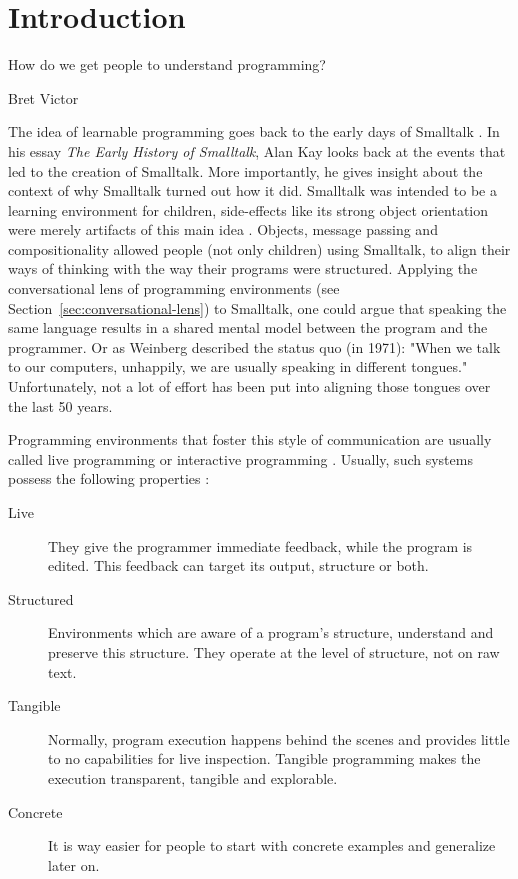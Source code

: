 \chapter[Introduction]{Introduction }
\epigraph{How do we get people to understand programming?}{Bret Victor}

The idea of learnable programming \cite{victor_learnable_2012} goes back to the early days of Smalltalk \cite{kay_early_1993}.
In his essay \emph{The Early History of Smalltalk}, Alan Kay looks back at the events that led to the creation of Smalltalk.
More importantly, he gives insight about the context of why Smalltalk turned out how it did.
Smalltalk was intended to be a learning environment for children, side-effects like its strong object orientation were merely artifacts of this main idea \cite{kay_early_1993}.
Objects, message passing and compositionality allowed people (not only children) using Smalltalk, to align their ways of thinking with the way their programs were structured.
Applying the conversational lens of programming environments (see Section~\ref{sec:conversational-lens}) to Smalltalk, one could argue that speaking the same language results in a shared mental model between the program and the programmer.
Or as Weinberg \cite{weinberg_psychology_1971} described the status quo (in 1971): "When we talk to our computers, unhappily, we are usually speaking in different tongues."
Unfortunately, not a lot of effort has been put into aligning those tongues over the last 50 years.

Programming environments that foster this style of communication are usually called live programming\cite{aguiar_live_2019, church_liveness_2010} or interactive programming \cite{czaplicki_interactive_2013, mccabe_towards_2023}.
Usually, such systems possess the following properties \cite{burg_1st_2013}:
\begin{description}
    \item[Live] They give the programmer immediate feedback, while the program is edited. This feedback can target its output, structure or both.
    \item[Structured] Environments which are aware of a program's structure, understand and preserve this structure. They operate at the level of structure, not on raw text.
    \item[Tangible] Normally, program execution happens behind the scenes and provides little to no capabilities for live inspection. Tangible programming makes the execution transparent, tangible and explorable.
    \item[Concrete] It is way easier for people to start with concrete examples and generalize later on.
\end{description}

